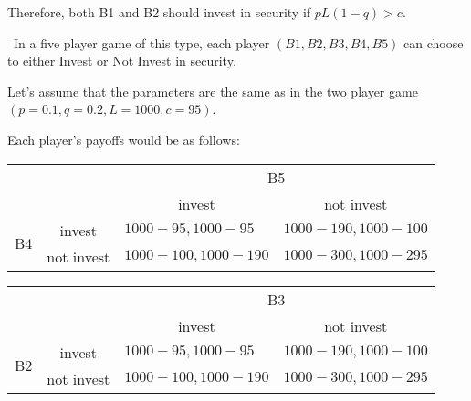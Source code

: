 \documentclass{homework}
\begin{document}
Therefore, both B1 and B2 should invest in security if $pL(1-q) > c$.

\Definition[6]\ 
In a five player game of this type, each player $(B1, B2, B3, B4, B5)$ can choose to either Invest or Not Invest in security.

Let's assume that the parameters are the same as in the two player game $(p = 0.1, q = 0.2, L = 1000, c = 95)$.

Each player's payoffs would be as follows:
\begin{table}[h]
\begin{tabular}{llll}
                                           	&                       	& \multicolumn{2}{c}{B5}                                                                                  	\\ \cline{3-4}
                                           	& \multicolumn{1}{l|}{} 	& \multicolumn{1}{c|}{invest}                             	& \multicolumn{1}{c|}{not invest}                             	\\ \cline{2-4}
\multicolumn{1}{c|}{\multirow{2}{*}{B4}} & \multicolumn{1}{c|}{invest}  & \multicolumn{1}{l|}{$1000 - 95, 1000 - 95$}  & \multicolumn{1}{l|}{$1000 - 190, 1000 - 100$}  \\ \cline{2-4}
\multicolumn{1}{c|}{}                      	& \multicolumn{1}{c|}{not invest} & \multicolumn{1}{l|}{$1000 - 100, 1000 - 190$} & \multicolumn{1}{l|}{$1000 - 300, 1000 - 295$} \\ \cline{2-4}
\end{tabular}
\end{table}
\begin{table}[h]
\begin{tabular}{llll}
                                           	&                       	& \multicolumn{2}{c}{B3}                                                                                  	\\ \cline{3-4}
                                           	& \multicolumn{1}{l|}{} 	& \multicolumn{1}{c|}{invest}                             	& \multicolumn{1}{c|}{not invest}                             	\\ \cline{2-4}
\multicolumn{1}{c|}{\multirow{2}{*}{B2}} & \multicolumn{1}{c|}{invest}  & \multicolumn{1}{l|}{$1000 - 95, 1000 - 95$}  & \multicolumn{1}{l|}{$1000 - 190, 1000 - 100$}  \\ \cline{2-4}
\multicolumn{1}{c|}{}                      	& \multicolumn{1}{c|}{not invest} & \multicolumn{1}{l|}{$1000 - 100, 1000 - 190$} & \multicolumn{1}{l|}{$1000 - 300, 1000 - 295$} \\ \cline{2-4}
\end{tabular}
\end{table}
\end{document}
